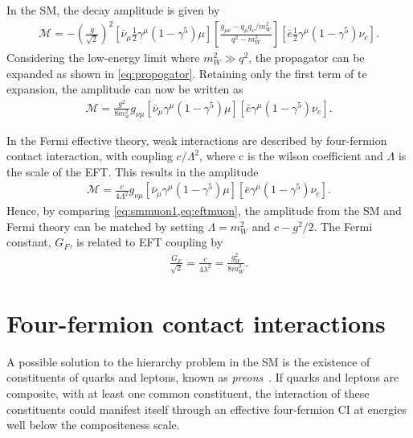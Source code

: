 In the SM, the decay amplitude is given by
\begin{equation}
    \label{eq:smmuon}
    \begin{aligned}
        \mathcal{M} =  - \left( \frac{g}{\sqrt{2}} \right)^2
        [\bar{\nu}_\mu\frac{1}{2}\gamma^\mu(1-\gamma^5)\mu]
        \left[ \frac{g_{\mu\nu} - q_\mu q_\nu/ m_W^2}{q^2 - m_W^2}  \right]
        [\bar{e}\frac{1}{2}\gamma^\mu(1-\gamma^5)\nu_e].
     \end{aligned}
\end{equation}
Considering the low-energy limit where $m_W^2 \gg q^2$, the propagator can be expanded as shown in \cref{eq:propogator}. Retaining only the first term of te expansion, the amplitude can now be written as
\begin{equation}
    \label{eq:smmuon1}
    \begin{aligned}
        \mathcal{M} =  \frac{g^2}{8 m_w^2}g_{\nu\mu}
        [\bar{\nu}_\mu\gamma^\mu(1-\gamma^5)\mu]
        [\bar{e}\gamma^\mu(1-\gamma^5)\nu_e].
     \end{aligned}
\end{equation}

In the Fermi effective theory, weak interactions are described by four-fermion contact interaction, with coupling $c/\Lambda^2$, where c is the wilson coefficient and $\Lambda$ is the scale of the EFT. This results in the amplitude
\begin{equation}
    \label{eq:eftmuon}
    \begin{aligned}
        \mathcal{M} =  \frac{c}{4\Lambda^2}g_{\nu\mu}
        [\bar{\nu}_\mu\gamma^\mu(1-\gamma^5)\mu]
        [\bar{e}\gamma^\mu(1-\gamma^5)\nu_e].
     \end{aligned}
\end{equation}
Hence, by comparing \cref{eq:smmuon1,eq:eftmuon}, the amplitude from the SM and Fermi theory can be matched by setting $\Lambda = m_W^2$ and $ c - g^2/2$. The Fermi constant, $G_F$, is related to EFT coupling by 
\begin{equation}
    \label{eq:fermiconstant}
    \begin{aligned}
        \frac{G_F}{\sqrt{2}} = \frac{c}{4\lambda^2} = \frac{g_W^2}{8m_W^2}. 
     \end{aligned}
\end{equation}

\section{Four-fermion contact interactions}
A possible solution to the hierarchy problem in the SM is the existence of constituents of quarks and leptons, known as \emph{preons}~\cite{Eichten:1984eu,Eichten:1983hw}. If quarks and leptons are composite, with at least one common constituent, the interaction of these constituents could manifest itself through an effective four-fermion CI at energies well below the compositeness scale.

